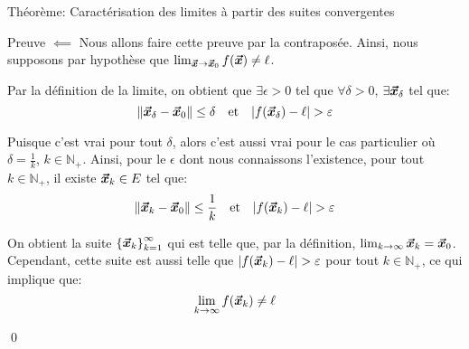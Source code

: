 \documentclass[a4paper]{article}
\begin{document}
\begin{parag}{Théorème: Caractérisation des limites à partir des suites convergentes}
    \begin{subparag}{Preuve $\impliedby$}
        Nous allons faire cette preuve par la contraposée. Ainsi, nous supposons par hypothèse que $\lim_{\bvec{x} \to \bvec{x}_0} f\left(\bvec{x}\right) \neq \ell$.

        Par la définition de la limite, on obtient que $\exists \epsilon > 0$ tel que $\forall \delta > 0$, $\exists \bm{\protect\vec{x}}_\delta$ tel que: 
        \[\left\|\bvec{x}_{\delta} - \bvec{x}_0\right\| \leq \delta \mathspace \text{et} \mathspace \left|f\left(\bvec{x}_{\delta}\right) - \ell\right| > \epsilon\]
        
        Puisque c'est vrai pour tout $\delta$, alors c'est aussi vrai pour le cas particulier où $\delta = \frac{1}{k}$, $k \in \mathbb{N}_+$. Ainsi, pour le $\epsilon$ dont nous connaissons l'existence, pour tout $k \in \mathbb{N}_+$, il existe $\bm{\protect\vec{x}}_k \in E$ tel que: 
        \[\left\|\bvec{x}_k - \bvec{x}_0\right\| \leq \frac{1}{k} \mathspace \text{et} \mathspace \left|f\left(\bvec{x}_k\right) - \ell\right| > \epsilon\]
        
        On obtient la suite $\left\{\bvec{x}_k\right\}_{k=1}^{\infty}$ qui est telle que, par la définition, $\lim_{k \to \infty} \bm{\protect\vec{x}}_k = \bm{\protect\vec{x}}_0$. Cependant, cette suite est aussi telle que $\left|f\left(\bvec{x}_k\right) - \ell\right| > \epsilon$ pour tout $k \in \mathbb{N}_+$, ce qui implique que: 
        \[\lim_{k \to \infty} f\left(\bvec{x}_k\right) \neq \ell\]

        \qed
    \end{subparag}
\end{parag}
\end{document}

